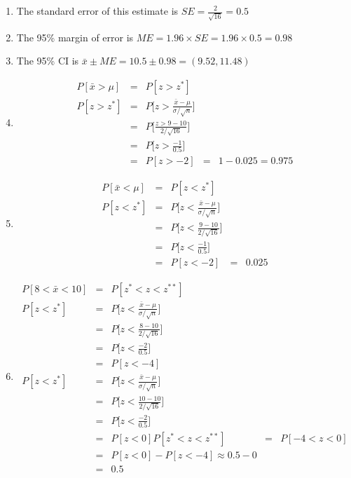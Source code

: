 \documentclass[11pt]{book}\usepackage[]{graphicx}\usepackage[]{color}
\begin{document}
\begin{exercises}
\begin{solution}
\begin{enumerate}
  \item The standard error of this estimate is $SE = \frac{2}{\sqrt{16}} = 0.5$
  \item The 95\% margin of error is $ME = 1.96 \times SE = 1.96 \times 0.5 = 0.98$
  \item The 95\% CI is $\bar{x} \pm ME = 10.5 \pm 0.98 = (9.52, 11.48) $ 
  \item 
  \begin{eqnarray*}
      P[ \bar{x} > \mu ] &=& P[z > z^*] \\
       P[z > z^*] &=& P\Big[ z > \frac{ \bar{x}-\mu}{ \sigma/\sqrt{n}} \Big] \\
       &=& P\Big[ \frac{z > 9 - 10}{ 2/\sqrt{16}} \Big] \\
       &=& P\Big[ z > \frac{-1}{0.5} \Big]   \\
        &=& P[z > -2]
        &=& 1 - 0.025 = 0.975
  \end{eqnarray*}
  
  \item 
  \begin{eqnarray*}
      P[ \bar{x} < \mu ] &=& P[z < z^*] \\
       P[z < z^*] &=& P\Big[ z < \frac{ \bar{x}-\mu}{ \sigma/\sqrt{n}} \Big] \\
       &=& P\Big[ z < \frac{ 9 - 10}{ 2/\sqrt{16}} \Big] \\
       &=& P\Big[ z < \frac{-1}{0.5} \Big]   \\
        &=& P[z < -2]
        &=&  0.025
  \end{eqnarray*}
 
  \item 
  \begin{eqnarray*}
      P[ 8 < \bar{x} < 10 ] &=& P[ z^* < z < z^{**} ] \\
       P[z < z^*] &=& P\Big[ z < \frac{ \bar{x}-\mu}{ \sigma/\sqrt{n}} \Big] \\
       &=& P\Big[ z < \frac{ 8 - 10}{ 2/\sqrt{16}} \Big] \\
       &=& P\Big[ z < \frac{-2}{0.5} \Big]   \\
        &=& P[z < -4] \\
        P[z < z^*] &=& P\Big[ z < \frac{ \bar{x}-\mu}{ \sigma/\sqrt{n}} \Big] \\
       &=& P\Big[ z < \frac{ 10 - 10}{ 2/\sqrt{16}} \Big] \\
       &=& P\Big[ z < \frac{-2}{0.5} \Big]   \\
        &=& P[z < 0]
      P[ z^* < z < z^{**} ] &=& P[ -4 < z < 0] \\  
        &=&  P[ z < 0 ] - P[z < -4] \approx 0.5 - 0 \\
        &=& 0.5
  \end{eqnarray*}
  

\end{enumerate}
\end{solution}
\end{exercises}
\end{document}
